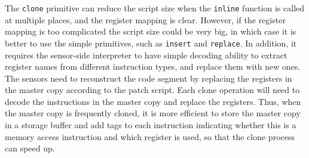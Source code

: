 The {\tt clone} primitive can reduce the script size when the {\tt inline} function is
called at multiple places, and the register mapping is clear. However, if the register mapping
is too complicated the script size could be very big, in which case it is better to use the simple primitives, such as 
{\tt insert} and {\tt replace}. In addition, it requires the sensor-side interpreter to have simple decoding ability to 
extract register names from different instruction types, and replace them with new ones. 
The sensors need to reconstruct the code segment
by replacing the registers in the master copy according to the patch script.
Each clone operation will need to decode the instructions in the master copy and
replace the registers. Thus, when the master copy is frequently cloned, it is more
efficient to store the master copy in a storage buffer and add tags
to each instruction indicating whether this is a memory access instruction and
which register is used, so that the clone process can speed up.





